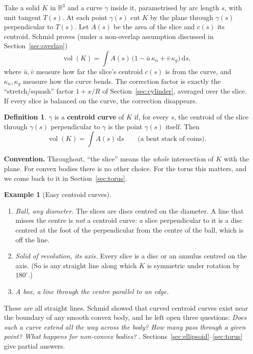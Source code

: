 \documentclass[11pt]{article}
\theoremstyle{plain}
\theoremstyle{definition}
\newtheorem{definition}[lemma]{Definition}
\newtheorem{example}[lemma]{Example}
\theoremstyle{remark}
\newcommand{\R}{\mathbb{R}}
\newcommand{\vol}{\operatorname{vol}}
\newcommand{\dd}{\,\mathrm{d}}
\begin{document}
Take a solid $K$ in $\R^3$ and a curve $\gamma$ inside it, parametrised by arc length $s$, with unit tangent $T(s)$. At each point $\gamma(s)$ cut $K$ by the plane through $\gamma(s)$ perpendicular to $T(s)$. Let $A(s)$ be the area of the slice and $c(s)$ its centroid. Schmid proves (under a non-overlap assumption discussed in Section~\ref{sec:overlap})
\begin{equation}\label{eq:schmid}
  \vol(K)=\int A(s)\,\bigl(1-\bar u\,\kappa_n+\bar v\,\kappa_g\bigr)\dd s,
\end{equation}
where $\bar u,\bar v$ measure how far the slice's centroid $c(s)$ is from the curve, and $\kappa_n,\kappa_g$ measure how the curve bends. The correction factor is exactly the ``stretch/squash'' factor $1+x/R$ of Section~\ref{sec:cylinder}, averaged over the slice. If every slice is balanced on the curve, the correction disappears.

\begin{definition}
$\gamma$ is a \textbf{centroid curve} of $K$ if, for every $s$, the centroid of the slice through $\gamma(s)$ perpendicular to $\gamma$ is the point $\gamma(s)$ itself. Then
\[
  \vol(K)=\int A(s)\dd s \qquad\text{(a bent stack of coins).}
\]
\end{definition}

\noindent\textbf{Convention.} Throughout, ``the slice'' means the \emph{whole} intersection of $K$ with the plane. For convex bodies there is no other choice. For the torus this matters, and we come back to it in Section~\ref{sec:torus}.

\begin{example}[Easy centroid curves]\label{ex:easy}
\begin{enumerate}[nosep]
\item \emph{Ball, any diameter.} The slices are discs centred on the diameter. A line that misses the centre is \emph{not} a centroid curve: a slice perpendicular to it is a disc centred at the foot of the perpendicular from the centre of the ball, which is off the line.
\item \emph{Solid of revolution, its axis.} Every slice is a disc or an annulus centred on the axis. (So is any straight line along which $K$ is symmetric under rotation by $180^\circ$.)
\item \emph{A box, a line through the centre parallel to an edge.}
\end{enumerate}
\end{example}

These are all straight lines. Schmid showed that curved centroid curves exist near the boundary of any smooth convex body, and he left open three questions: \emph{Does such a curve extend all the way across the body? How many pass through a given point? What happens for non-convex bodies?} \cite{schmid}. Sections~\ref{sec:ellipsoid}--\ref{sec:torus} give partial answers.
\end{document}

